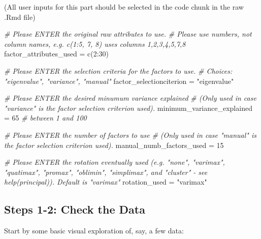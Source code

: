 \documentclass[
]{article}
\newenvironment{Shaded}{\begin{snugshade}}{\end{snugshade}}
\newcommand{\CommentTok}[1]{\textcolor[rgb]{0.56,0.35,0.01}{\textit{#1}}}
\newcommand{\DecValTok}[1]{\textcolor[rgb]{0.00,0.00,0.81}{#1}}
\newcommand{\FunctionTok}[1]{\textcolor[rgb]{0.00,0.00,0.00}{#1}}
\newcommand{\NormalTok}[1]{#1}
\newcommand{\OtherTok}[1]{\textcolor[rgb]{0.56,0.35,0.01}{#1}}
\newcommand{\SpecialCharTok}[1]{\textcolor[rgb]{0.00,0.00,0.00}{#1}}
\newcommand{\StringTok}[1]{\textcolor[rgb]{0.31,0.60,0.02}{#1}}
\begin{document}
(All user inputs for this part should be selected in the code chunk in
the raw .Rmd file)

\begin{Shaded}
\begin{Highlighting}[]
\CommentTok{\# Please ENTER the original raw attributes to use. }
\CommentTok{\# Please use numbers, not column names, e.g. c(1:5, 7, 8) uses columns 1,2,3,4,5,7,8}
\NormalTok{factor\_attributes\_used }\OtherTok{=} \FunctionTok{c}\NormalTok{(}\DecValTok{2}\SpecialCharTok{:}\DecValTok{30}\NormalTok{)}

\CommentTok{\# Please ENTER the selection criteria for the factors to use. }
\CommentTok{\# Choices: "eigenvalue", "variance", "manual"}
\NormalTok{factor\_selectionciterion }\OtherTok{=} \StringTok{"eigenvalue"}

\CommentTok{\# Please ENTER the desired minumum variance explained }
\CommentTok{\# (Only used in case "variance" is the factor selection criterion used). }
\NormalTok{minimum\_variance\_explained }\OtherTok{=} \DecValTok{65}  \CommentTok{\# between 1 and 100}

\CommentTok{\# Please ENTER the number of factors to use }
\CommentTok{\# (Only used in case "manual" is the factor selection criterion used).}
\NormalTok{manual\_numb\_factors\_used }\OtherTok{=} \DecValTok{15}

\CommentTok{\# Please ENTER the rotation eventually used (e.g. "none", "varimax", "quatimax", "promax", "oblimin", "simplimax", and "cluster" {-} see help(principal)). Default is "varimax"}
\NormalTok{rotation\_used }\OtherTok{=} \StringTok{"varimax"}
\end{Highlighting}
\end{Shaded}

\hypertarget{steps-1-2-check-the-data}{%
\subsection{Steps 1-2: Check the Data}\label{steps-1-2-check-the-data}}

Start by some basic visual exploration of, say, a few data:
\end{document}
